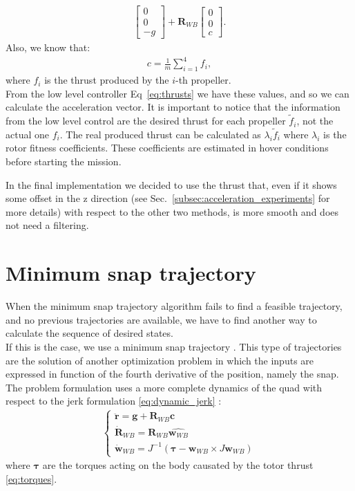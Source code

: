 \begin{itemize}
\begin{align}
{\begin{bmatrix}
0 \\[10pt]
0 \\[10pt]
-g
\end{bmatrix}} 
+ \boldsymbol{R}_{WB}
{\begin{bmatrix}
0 \\[10pt]
0 \\[10pt]
c
\end{bmatrix}}.
\end{align}
Also, we know that:
 \begin{align}
c = \frac{1}{m}\sum_{i=1}^{4}{f_i},
\end{align}
where $f_i$ is the thrust produced by the $i$-th propeller.\\
From the low level controller Eq~\eqref{eq:thrusts} we have these values, and so we can calculate the acceleration vector. It is important to notice that the information from the low level control are the desired thrust for each propeller $\tilde{f}_i$, not the actual one $f_i$. The real produced thrust can be calculated as $\lambda_i\tilde{f}_i$ where $\lambda_i$ is the rotor fitness coefficients. These coefficients are estimated in hover conditions before starting the mission.
\end{itemize}

In the final implementation we decided to use the thrust that, even if it shows some offset in the z direction (see Sec.~\ref{subsec:acceleration_experiments} for more details) with respect to the other two methods, is more smooth and does not need a filtering.


\section{Minimum snap trajectory}
When the minimum snap trajectory algorithm fails to find a feasible trajectory, and no previous trajectories are available, we have to find another way to calculate the sequence of desired states.\\
If this is the case, we use a minimum snap trajectory \cite{mellinger2011minimum}. This type of trajectories are the solution of another optimization problem in which the inputs are expressed in function of the fourth derivative of the position, namely the snap.\\

The problem formulation uses a more complete dynamics of the quad with respect to the jerk formulation \eqref{eq:dynamic_jerk}
:
\begin{align}
\begin{cases}
\ddot{\boldsymbol{r}} = \boldsymbol{g} + \boldsymbol{R}_{WB}\boldsymbol{c}  \\[10pt]
\dot{\boldsymbol{R}}_{WB} = \boldsymbol{R}_{WB}\hat{\boldsymbol{w}_{WB}}  \\[10pt]
\dot{\boldsymbol{w}}_{WB} = J^{-1} (\boldsymbol{\tau} - \boldsymbol{w}_{WB} \times J\boldsymbol{w}_{WB})
\end{cases}
\end{align}
where $\boldsymbol{\tau}$ are the torques acting on the body causated by the totor thrust \eqref{eq:torques}.\\

